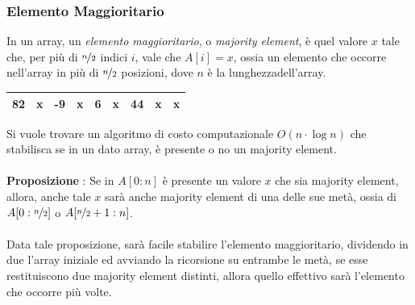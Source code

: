 \documentclass[12pt, letterpaper]{article}
\newcommand{\acc}{\\\hphantom{}\\}
\begin{document}
\subsubsection{Elemento Maggioritario}
In un array, un \textit{elemento maggioritario}, o \textit{majority element}, è quel valore $x$ tale che, 
per più di $\nicefrac{n}{2}$ indici $i$, vale che $A[i]=x$, ossia un elemento che occorre nell'array in più di 
$\nicefrac{n}{2}$ posizioni, dove $n$ è la lunghezzadell'array.
\begin{center}
    \begin{tabular}{|c|c|c|c|c|c|c|c|c|}
        \hline
        82 & x & -9 & x & 6 & x & 44 & x & x \\ \hline
        \end{tabular}
\end{center}
Si vuole trovare un algoritmo di costo computazionale $O(n\cdot\log{n})$ che stabilisca se in un dato array, è 
presente o no un majority element.\acc 
\textbf{Proposizione} : Se in $A[0:n]$ è presente un valore $x$ che sia majority element, allora, anche tale $x$ sarà 
anche majority element di una delle sue metà, ossia di $A[0:\nicefrac{n}{2}]$ o $A[\nicefrac{n}{2}+1:n]$.\acc 
Data tale proposizione, sarà facile stabilire l'elemento maggioritario, dividendo in due l'array iniziale ed avviando la ricorsione 
su entrambe le metà, se esse restituiscono due majority element distinti, allora quello effettivo sarà l'elemento che occorre più volte.
\end{document}
